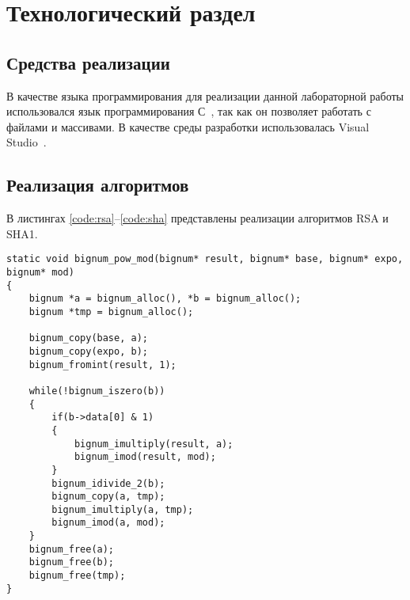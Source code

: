 \chapter{Технологический раздел}
\label{cha:impl}

\section{Средства реализации}

В качестве языка программирования для реализации данной лабораторной работы использовался язык программирования С~\cite{cplusplus}, так как он позволяет работать с файлами и массивами. В качестве среды разработки использовалась Visual Studio~\cite{vscode}.

\section{Реализация алгоритмов}

В листингах \ref{code:rsa}--\ref{code:sha} представлены реализации алгоритмов RSA и SHA1.

\begin{lstlisting}[label=code:rsa,caption=Функция шифрования]
static void bignum_pow_mod(bignum* result, bignum* base, bignum* expo, bignum* mod)
{
	bignum *a = bignum_alloc(), *b = bignum_alloc();
	bignum *tmp = bignum_alloc();
	
	bignum_copy(base, a);
	bignum_copy(expo, b);
	bignum_fromint(result, 1);
	
	while(!bignum_iszero(b))
	{
		if(b->data[0] & 1)
		{
			bignum_imultiply(result, a);
			bignum_imod(result, mod);
		}
		bignum_idivide_2(b);
		bignum_copy(a, tmp);
		bignum_imultiply(a, tmp);
		bignum_imod(a, mod);
	}
	bignum_free(a);
	bignum_free(b);
	bignum_free(tmp);
}
\end{lstlisting}

